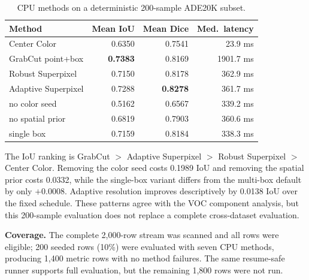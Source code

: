 \begin{table}[ht]
\centering
\caption{CPU methods on a deterministic 200-sample ADE20K subset.}
\begin{tabular}{lrrr}
\toprule
Method & Mean IoU & Mean Dice & Med.\ latency \\
\midrule
Center Color & 0.6350 & 0.7541 & 23.9 ms \\
GrabCut point+box & \textbf{0.7383} & 0.8169 & 1901.7 ms \\
Robust Superpixel & 0.7150 & 0.8178 & 362.9 ms \\
Adaptive Superpixel & 0.7288 & \textbf{0.8278} & 361.7 ms \\
\quad no color seed & 0.5162 & 0.6567 & 339.2 ms \\
\quad no spatial prior & 0.6819 & 0.7903 & 360.6 ms \\
\quad single box & 0.7159 & 0.8184 & 338.3 ms \\
\bottomrule
\end{tabular}
\end{table}

The IoU ranking is GrabCut $>$ Adaptive Superpixel $>$ Robust Superpixel $>$ Center Color. Removing the color seed costs 0.1989 IoU and removing the spatial prior costs 0.0332, while the single-box variant differs from the multi-box default by only $+0.0008$. Adaptive resolution improves descriptively by 0.0138 IoU over the fixed schedule. These patterns agree with the VOC component analysis, but this 200-sample evaluation does not replace a complete cross-dataset evaluation.

\noindent\textbf{Coverage.} The complete 2,000-row stream was scanned and all rows were eligible; 200 seeded rows (10\%) were evaluated with seven CPU methods, producing 1,400 metric rows with no method failures. The same resume-safe runner supports full evaluation, but the remaining 1,800 rows were not run.


